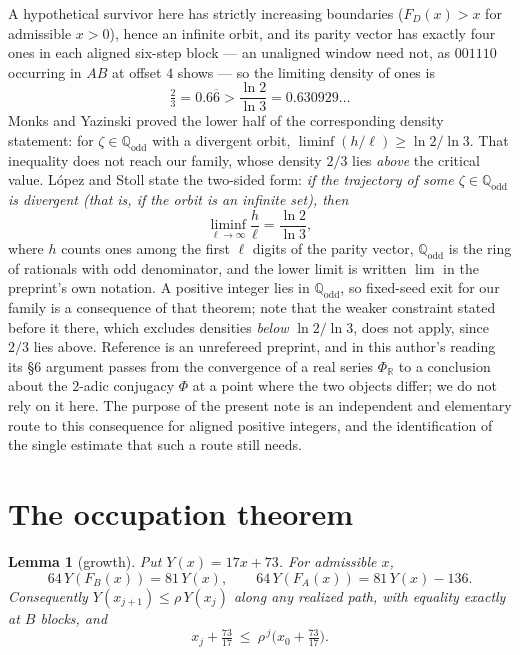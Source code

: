 \documentclass[11pt,a4paper]{article}
\theoremstyle{plain}
\newtheorem{lemma}[theorem]{Lemma}
\theoremstyle{definition}
\theoremstyle{remark}
\begin{document}
A hypothetical survivor here has strictly increasing boundaries
($F_D(x)>x$ for admissible $x>0$), hence an infinite orbit, and its parity
vector has exactly four ones in each aligned six-step block --- an unaligned
window need not, as $001110$ occurring in $AB$ at offset $4$ shows --- so the
limiting density of ones is
\[
\tfrac{2}{3}=0.6\overline{6}>\frac{\ln 2}{\ln 3}=0.630929\ldots
\]
Monks and Yazinski \cite[Theorem 2.7(b)]{MonksYazinski2004} proved the lower
half of the corresponding density statement: for $\zeta\in\mathbb{Q}_{\mathrm{odd}}$
with a divergent orbit, $\liminf(h/\ell)\ge\ln2/\ln3$. That inequality does not
reach our family, whose density $2/3$ lies \emph{above} the critical value.
L\'opez and Stoll \cite[Theorem 1]{LopezStoll2021} state the two-sided form:
\emph{if the trajectory of some $\zeta\in\mathbb{Q}_{\mathrm{odd}}$ is divergent
(that is, if the orbit is an infinite set), then}
\[
\liminf_{\ell\to\infty}\frac{h}{\ell}=\frac{\ln 2}{\ln 3},
\]
where $h$ counts ones among the first $\ell$ digits of the parity vector,
$\mathbb{Q}_{\mathrm{odd}}$ is the ring of rationals with odd denominator, and
the lower limit is written $\lim$ in the preprint's own notation.
A positive integer lies in $\mathbb{Q}_{\mathrm{odd}}$, so fixed-seed exit for
our family is a consequence of that theorem; note that the weaker constraint
stated before it there, which excludes densities \emph{below} $\ln2/\ln3$, does
not apply, since $2/3$ lies above. Reference \cite{LopezStoll2021} is an
unrefereed preprint, and in this author's reading its \S6 argument passes from
the convergence of a real series $\Phi_{\mathbb{R}}$ to a conclusion about the
$2$-adic conjugacy $\Phi$ at a point where the two objects differ; we do not
rely on it here. The purpose of the present note is an independent and
elementary route to this consequence for aligned positive integers, and the
identification of the single estimate that such a route still needs.

\section{The occupation theorem}

\begin{lemma}[growth]\label{lem:growth}
Put $Y(x)=17x+73$. For admissible $x$,
\[
64\,Y(F_B(x))=81\,Y(x),\qquad 64\,Y(F_A(x))=81\,Y(x)-136 .
\]
Consequently $Y(x_{j+1})\le\rho\,Y(x_j)$ along any realized path, with equality
exactly at $B$ blocks, and
\begin{equation}\label{eq:growth}
x_j+\tfrac{73}{17}\ \le\ \rho^{\,j}\bigl(x_0+\tfrac{73}{17}\bigr).
\end{equation}
\end{lemma}
\end{document}
